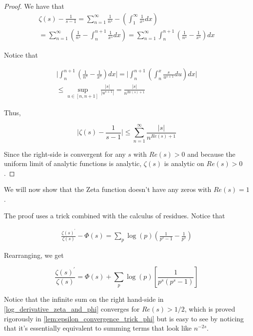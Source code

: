 \documentclass{article}
\theoremstyle{definition}
\begin{document}
\begin{proof}
    We have that
    \begin{align*}
        \zeta(s) - \frac{1}{s - 1} = \sum_{n = 1}^{\infty} \frac{1}{n^{s}} - (\int_{1}^{\infty} \frac{1}{x^{s}} dx) \\
        = \sum_{n = 1}^{\infty} (\frac{1}{n^{s}} - \int_{n}^{n + 1} \frac{1}{x^{s}} dx) = \sum_{n = 1}^{\infty} \int_{n}^{n+1} (\frac{1}{n^{s}} - \frac{1}{x^{s}}) dx
    \end{align*}

    Notice that

    \begin{align*}
        \lvert \int_{n}^{n+1} (\frac{1}{n^{s}} - \frac{1}{x^{s}}) dx \rvert = \lvert \int_{n}^{n+1} (\int_{n}^{x} \frac{s}{u^{s+1}} du) dx \rvert \\
        \leq \sup_{u \in [n,n+1]} \frac{\lvert s \rvert}{\lvert u^{s+1} \rvert} = \frac{\lvert s \rvert}{n^{Re(s) + 1}}
    \end{align*} 

    Thus, 

    \[ \lvert \zeta(s) - \frac{1}{s - 1} \rvert \leq \sum_{n = 1}^{\infty} \frac{\lvert s \rvert}{n^{Re(s) + 1}} \]

    Since the right-side is convergent for any $ s $ with $ Re(s) > 0 $ and because
    the uniform limit of analytic functions is analytic, $ \zeta(s) $ is analytic on $ Re(s) > 0 $.
\end{proof}

We will now show that the Zeta function doesn't have any zeros with $ Re(s) = 1 $.

The proof uses a trick combined with the calculus of residues. Notice that

\begin{align}\label{log_derivative_zeta_and_phi}
    \frac{\zeta(s)^{\prime}}{\zeta(s)} - \Phi(s) = \sum_{p} \log(p) (\frac{1}{p^{s} - 1} - \frac{1}{p^{s}}) 
\end{align}
    
Rearranging, we get

\[ \frac{\zeta(s)^{\prime}}{\zeta(s)} = \Phi(s) + \sum_{p} \log(p)[\frac{1}{p^{s}(p^{s} - 1)}] \]

Notice that the infinite sum on the right hand-side in \ref{log_derivative_zeta_and_phi} converges for $ Re(s) > 1/2 $,
which is proved rigorously in \ref{lem:epsilon_convergence_trick_phi} but is easy 
to see by noticing that it's essentially equivalent to summing terms that look like
$ n^{-2s} $.
\end{document}
